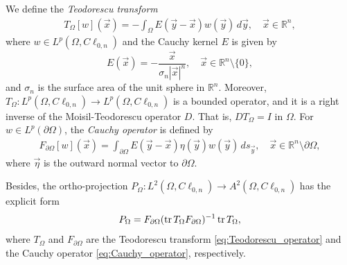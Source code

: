 \documentclass[12pt]{article}
\def\D{\mathbb{D}}
\def\R{\mathbb{R}}
\def\tr{\operatorname{\rm tr}}
\newcommand{\JLb}[1]{\textcolor{blue}{#1}}
\begin{document}
We define the \textit{Teodorescu transform} \cite{GuHaSpr2008}
\begin{align}\label{eq:Teodorescu_operator}
   T_{\Omega}[w](\vec x)=-\int_{\Omega} 
	  E(\vec y-\vec x) w(\vec y)\, d\vec y, \quad \vec x\in\R^n,
\end{align}
where $w\in L^p(\Omega,C\ell_{0,n})$ and the Cauchy kernel $E$ is given by
\begin{equation}\label{eq:Cauchy-kernel}
E(\vec x)=-\frac{\vec x}{\sigma_n|\vec x|^n}, \quad \vec x\in \R^n\setminus\{0\},
\end{equation}
and $\sigma_n$ is the surface area of the unit sphere in $\R^n$. Moreover, $T_{\Omega}\colon L^p(\Omega, C\ell_{0,n})\to L^p(\Omega, C\ell_{0,n})$ is a bounded operator, and it is a right inverse of the Moisil-Teodorescu operator $D$. That is, $DT_{\Omega}=I$ in $\Omega$.
For $w\in L^p(\partial\Omega)$, the \textit{Cauchy operator} is defined by
\begin{align}\label{eq:Cauchy_operator}
   F_{\partial\Omega}[w](\vec x)=\int_{\partial\Omega} 
	  E(\vec y-\vec x) \eta (\vec y)w(\vec y)\, ds_{\vec y}, \quad \vec x\in\R^n\setminus \partial\Omega,
\end{align}
where $\vec \eta$ is the outward normal vector to $\partial\Omega$.

Besides, the ortho-projection $P_{\Omega} \colon L^2(\Omega,C\ell_{0,n}) \to A^2(\Omega,C\ell_{0,n})$ has the explicit form
\begin{align}\label{eq:Bergman_projection}
   P_{\Omega}=F_{\partial\Omega} (\tr T_{\Omega} F_{\partial\Omega})^{-1} \tr T_{\Omega},
\end{align}
where $T_{\Omega}$ and $F_{\partial\Omega}$ are the Teodorescu transform \eqref{eq:Teodorescu_operator} and the Cauchy operator \eqref{eq:Cauchy_operator}, respectively.
\end{document}
